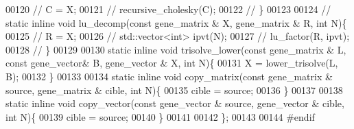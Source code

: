 \begin{DoxyCode}
00120 \textcolor{comment}{//     C = X;}
00121 \textcolor{comment}{//     recursive\_cholesky(C);}
00122 \textcolor{comment}{//   \}}
00123 
00124 \textcolor{comment}{//   static inline void lu\_decomp(const gene\_matrix & X, gene\_matrix & R, int N)\{}
00125 \textcolor{comment}{//     R = X;}
00126 \textcolor{comment}{//     std::vector<int> ipvt(N);}
00127 \textcolor{comment}{//     lu\_factor(R, ipvt);}
00128 \textcolor{comment}{//   \}}
00129 
00130   \textcolor{keyword}{static} \textcolor{keyword}{inline} \textcolor{keywordtype}{void} trisolve\_lower(\textcolor{keyword}{const} gene\_matrix & L, \textcolor{keyword}{const} gene\_vector& B, gene\_vector & X, \textcolor{keywordtype}{int} N)\{
00131     X = lower\_trisolve(L, B);
00132   \}
00133 
00134   \textcolor{keyword}{static} \textcolor{keyword}{inline} \textcolor{keywordtype}{void} copy\_matrix(\textcolor{keyword}{const} gene\_matrix & source, gene\_matrix & cible, \textcolor{keywordtype}{int} N)\{
00135     cible = source;
00136   \}
00137 
00138   \textcolor{keyword}{static} \textcolor{keyword}{inline} \textcolor{keywordtype}{void} copy\_vector(\textcolor{keyword}{const} gene\_vector & source, gene\_vector & cible, \textcolor{keywordtype}{int} N)\{
00139     cible = source;
00140   \}
00141 
00142 \};
00143 
00144 \textcolor{preprocessor}{#endif}
\end{DoxyCode}
